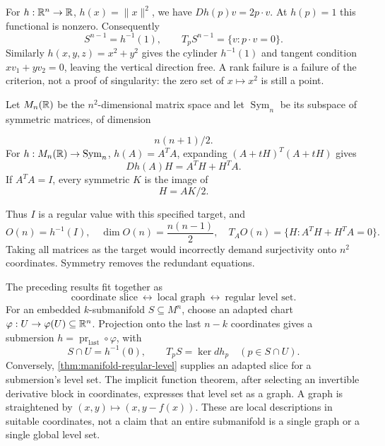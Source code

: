 \begin{example}
For $h:\mathbb{R}^n\to\mathbb{R}$, $h(x)=\|x\|^2$, we have $Dh(p)v=2p\cdot v$.
At $h(p)=1$ this functional is nonzero. Consequently
\[
S^{n-1}=h^{-1}(1),\qquad T_pS^{n-1}=\{v:p\cdot v=0\}.
\]
Similarly $h(x,y,z)=x^2+y^2$ gives the cylinder $h^{-1}(1)$ and tangent
condition $xv_1+yv_2=0$, leaving the vertical direction free.
A rank failure is a failure of the criterion, not a proof of singularity:
the zero set of $x\mapsto x^2$ is still a point.
\end{example}
\begin{example}\label{ex:orthogonal-level}
Let $M_n(\mathbb{R})$ be the $n^2$-dimensional matrix space and let
$\operatorname{Sym}_n$ be its subspace of symmetric matrices, of dimension

\[
n(n+1)/2.
\]
 For $h:M_n(\mathbb{R})\to\operatorname{Sym}_n$, $h(A)=A^TA$,
expanding $(A+tH)^T(A+tH)$ gives
\[
Dh(A)H=A^TH+H^TA.
\]
If $A^TA=I$, every symmetric $K$ is the image of
\[
H=AK/2.
\]

Thus $I$ is a regular value with this specified target, and
\[
O(n)=h^{-1}(I),\quad \dim O(n)=\frac{n(n-1)}2,\quad
T_AO(n)=\{H:A^TH+H^TA=0\}.
\]
Taking all matrices as the target would incorrectly demand surjectivity
onto $n^2$ coordinates. Symmetry removes the redundant equations.
\end{example}

\begin{remark}
\label{rem:submanifold-three-pictures}
The preceding results fit together as
\[
\text{coordinate slice}\ \longleftrightarrow\ \text{local graph}
\ \longleftrightarrow\ \text{regular level set}.
\]
For an embedded $k$-submanifold $S\subseteq M^n$, choose an adapted chart
$\varphi:U\to\varphi(U)\subseteq\mathbb{R}^n$. Projection onto the last $n-k$
coordinates gives a submersion $h=\operatorname{pr}_{\mathrm{last}}\circ\varphi$,
with
\[
S\cap U=h^{-1}(0),\qquad T_pS=\ker dh_p\quad(p\in S\cap U).
\]
Conversely, \cref{thm:manifold-regular-level} supplies an adapted slice for
a submersion's level set. The implicit function theorem, after selecting
an invertible derivative block in coordinates, expresses that level set
as a graph. A graph is straightened by $(x,y)\mapsto(x,y-f(x))$.
These are local descriptions in suitable coordinates, not a claim that an
entire submanifold is a single graph or a single global level set.
\end{remark}

